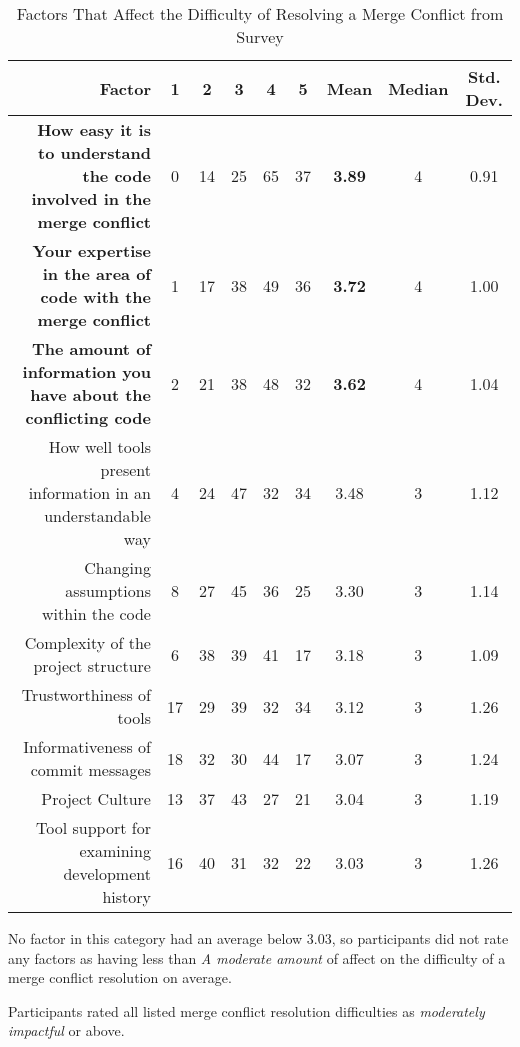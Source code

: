 \begin{table*}[!]
\renewcommand{\arraystretch}{1.3}
\caption{Factors That Affect the Difficulty of Resolving a Merge Conflict from Survey}
\label{survey_res_diffs}
\centering
\begin{tabularx}{0.9\textwidth}{r | *5{c} | *3{c}}

\toprule
	Factor & 1 & 2 & 3 & 4 & 5 & Mean & Median & Std. Dev. \\
\midrule
	\textbf{How easy it is to understand the code involved in the merge conflict} & 0 & 14 & 25 & 65 & 37 & \textbf{3.89} & 4 & 0.91\\
	\textbf{Your expertise in the area of code with the merge conflict} & 1 & 17 & 38 & 49 & 36 & \textbf{3.72} & 4 & 1.00\\
	\textbf{The amount of information you have about the conflicting code} & 2 & 21 & 38 & 48 & 32 & \textbf{3.62} & 4 & 1.04\\
	How well tools present information in an understandable way & 4 & 24 & 47 & 32 & 34 & 3.48 & 3 & 1.12\\
	Changing assumptions within the code & 8 & 27 & 45 & 36 & 25 & 3.30 & 3 & 1.14\\
	Complexity of the project structure & 6 & 38 & 39 & 41 & 17 & 3.18 & 3 & 1.09\\
	Trustworthiness of tools & 17 & 29 & 39 & 32 & 34 & 3.12 & 3 & 1.26\\
	Informativeness of commit messages & 18 & 32 & 30 & 44 & 17 & 3.07 & 3 & 1.24\\
	Project Culture & 13 & 37 & 43 & 27 & 21 & 3.04 & 3 & 1.19\\
	Tool support for examining development history & 16 & 40 & 31 & 32 & 22 & 3.03 & 3 & 1.26\\
\bottomrule
\end{tabularx}
\end{table*}

No factor in this category had an average below 3.03, so participants did not rate any factors as having less than \textit{A moderate amount} of affect on the difficulty of a merge conflict resolution on average.

\begin{tcolorbox}[enhanced,minipage boxed title,enhanced,title={Takeaway \arabic{takeawaycounter}},
attach boxed title to top left=
{xshift=0mm,yshift=-1mm},
boxed title style={size=small}]
Participants rated all listed merge conflict resolution difficulties as \textit{moderately impactful} or above.
\end{tcolorbox}
\addtocounter{takeawaycounter}{1}

